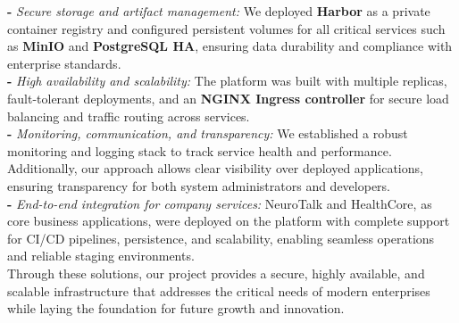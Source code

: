 \documentclass[a4paper,12pt]{report}
\begin{document}
\begin{doublespace}
\textbf{-} \textit{Secure storage and artifact management:} We deployed \textbf{Harbor} as a private container registry and configured persistent volumes for all critical services such as \textbf{MinIO} and \textbf{PostgreSQL HA}, ensuring data durability and compliance with enterprise standards. \\

\textbf{-} \textit{High availability and scalability:} The platform was built with multiple replicas, fault-tolerant deployments, and an \textbf{NGINX Ingress controller} for secure load balancing and traffic routing across services. \\

\textbf{-} \textit{Monitoring, communication, and transparency:} We established a robust monitoring and logging stack to track service health and performance. Additionally, our approach allows clear visibility over deployed applications, ensuring transparency for both system administrators and developers. \\

\textbf{-} \textit{End-to-end integration for company services:} NeuroTalk and HealthCore, as core business applications, were deployed on the platform with complete support for CI/CD pipelines, persistence, and scalability, enabling seamless operations and reliable staging environments. \\

Through these solutions, our project provides a secure, highly available, and scalable infrastructure that addresses the critical needs of modern enterprises while laying the foundation for future growth and innovation.

\end{doublespace}
\end{document}
